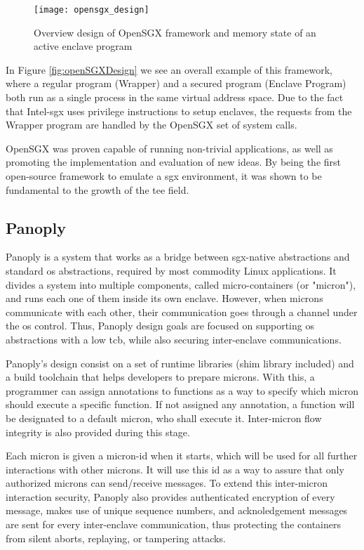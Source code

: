 \begin{figure}[htbp]
	\centering
	{\texttt{[image: opensgx\_design]}}%
	\caption{Overview design of OpenSGX framework and memory state of an active enclave program}
	\label{openSGXDesign}
\end{figure}

In Figure \ref{fig:openSGXDesign} we see an overall example of this framework, where a regular program (Wrapper) and a secured program (Enclave Program) both run as a single process in the same virtual address space. Due to the fact that Intel-\gls{sgx} uses privilege instructions to setup enclaves, the requests from the Wrapper program are handled by the OpenSGX set of system calls.

OpenSGX was proven capable of running non-trivial applications, as well as promoting the implementation and evaluation of new ideas. By being the first open-source framework to emulate a \gls{sgx} environment, it was shown to be fundamental to the growth of the \gls{tee} field.


\subsection{Panoply}

Panoply \cite{panoplyPaper} is a system that works as a bridge between \gls{sgx}-native abstractions and standard \gls{os} abstractions, required by most commodity Linux applications. 
It divides a system into multiple components, called micro-containers (or "micron"), and runs each one of them inside its own enclave. 
However, when microns communicate with each other, their communication goes through a channel under the \gls{os} control. Thus, Panoply design goals are focused on supporting \gls{os} abstractions with a low \gls{tcb}, while also securing inter-enclave communications.

Panoply's design consist on a set of runtime libraries (shim library included) and a build toolchain that helps developers to prepare microns.
With this, a programmer can assign annotations to functions as a way to specify which micron should execute a specific function. If not assigned any annotation, a function will be designated to a default micron, who shall execute it. Inter-micron flow integrity is also provided during this stage. 

Each micron is given a micron-id when it starts, which will be used for all further interactions with other microns. It will use this id as a way to assure that only authorized microns can send/receive messages.
To extend this inter-micron interaction security, Panoply also provides authenticated encryption of every message, makes use of unique sequence numbers, and acknoledgement messages are sent for every inter-enclave communication, thus protecting the containers from silent aborts, replaying, or tampering attacks.

